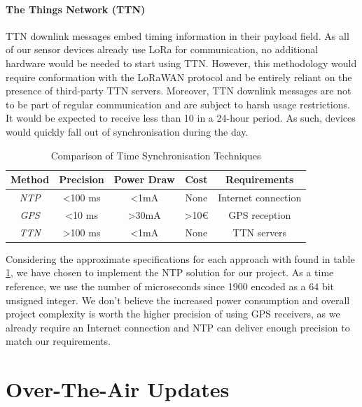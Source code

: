 \documentclass[conference]{IEEEtran}
\begin{document}
\paragraph{The Things Network (TTN)} TTN downlink messages embed timing information in their payload field. As all of our sensor devices already use LoRa for communication, no additional hardware would be needed to start using TTN. However, this methodology would require conformation with the LoRaWAN protocol and be entirely reliant on the presence of third-party TTN servers. Moreover, TTN downlink messages are not to be part of regular communication and are subject to harsh usage restrictions. It would be expected to receive less than 10 in a 24-hour period. As such, devices would quickly fall out of synchronisation during the day.

\begin{table}[ht]
\caption{Comparison of Time Synchronisation Techniques}
\begin{center}
\begin{tabular}{|c|c|c|c|c|}
\hline
\textbf{Method} & \textbf{Precision} & \textbf{Power Draw} & \textbf{Cost} & \textbf{Requirements} \\
\hline
\textit{NTP} & \textless 100 ms & \textless 1mA & None & Internet connection \\
\hline
\textit{GPS} & \textless 10 ms & \textgreater 30mA & \textgreater 10€ & GPS reception \\
\hline
\textit{TTN} & \textgreater 100 ms & \textless 1mA & None & TTN servers \\
\hline
\end{tabular}
\label{synchronisation_table}
\end{center}
\end{table}

Considering the approximate specifications for each approach with found in table \ref{synchronisation_table}, we have chosen to implement the NTP solution for our project. As a time reference, we use the number of microseconds since 1900 encoded as a 64 bit unsigned integer. We don't believe the increased power consumption and overall project complexity is worth the higher precision of using GPS receivers, as we already require an Internet connection and NTP can deliver enough precision to match our requirements.




\section{Over-The-Air Updates} \label{updates}
\end{document}
